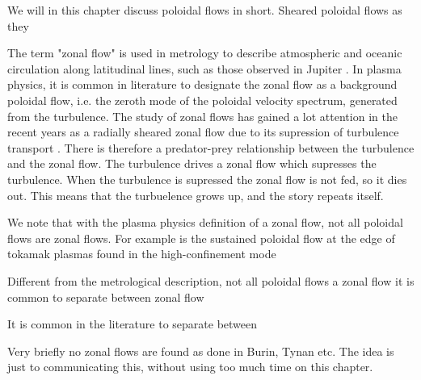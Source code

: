 We will in this chapter discuss poloidal flows in short.
Sheared poloidal flows as they

The term "zonal flow" is used in metrology to describe atmospheric and oceanic circulation along latitudinal lines, such as those observed in Jupiter \cite{Limaye1986}.
In plasma physics, it is common in literature to designate the zonal flow as a background poloidal flow, i.e. the zeroth mode of the poloidal velocity spectrum, generated from the turbulence.
The study of zonal flows has gained a lot attention in the recent years as a radially sheared zonal flow due to its supression of turbulence transport \cite{Diamond2005a}.
There is therefore a predator-prey relationship between the turbulence and the zonal flow.
The turbulence drives a zonal flow which supresses the turbulence.
When the turbulence is supressed the zonal flow is not fed, so it dies out.
This means that the turbuelence grows up, and the story repeats itself.

We note that with the plasma physics definition of a zonal flow, not all poloidal flows are zonal flows.
For example is the sustained poloidal flow at the edge of tokamak plasmas found in the high-confinement mode

Different from the metrological description, not all poloidal flows  a zonal flow
it is common to separate between zonal flow

It is common in the literature to separate between


Very briefly no zonal flows are found as done in Burin, Tynan etc.
The idea is just to communicating this, without using too much time on this chapter.

